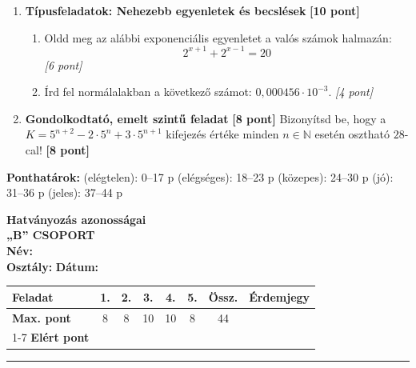 \documentclass[11pt,a4paper]{article}
\begin{document}
\begin{enumerate}
    \vspace{2mm}
    \item \textbf{Típusfeladatok: Nehezebb egyenletek és becslések} \hfill \textbf{[10 pont]}
    \begin{enumerate}
        \item Oldd meg az alábbi exponenciális egyenletet a valós számok halmazán:
        $$2^{x+1} + 2^{x-1} = 20$$ \hfill \textit{[6 pont]}
        \item Írd fel normálalakban a következő számot: $0{,}000456 \cdot 10^{-3}$. \hfill \textit{[4 pont]}
    \end{enumerate}

    \vspace{2mm}
    \item \textbf{Gondolkodtató, emelt szintű feladat} \hfill \textbf{[8 pont]}
    Bizonyítsd be, hogy a $K = 5^{n+2} - 2 \cdot 5^n + 3 \cdot 5^{n+1}$ kifejezés értéke minden $n \in \mathbb{N}$ esetén osztható $28$-cal! \hfill \textbf{[8 pont]}
\end{enumerate}

\vfill
\noindent
\begin{center}
\small
\textbf{Ponthatárok:}  (elégtelen): 0--17 p  (elégséges): 18--23 p  (közepes): 24--30 p  (jó): 31--36 p  (jeles): 37--44 p
\end{center}

\newpage


\noindent
\begin{minipage}[t]{0.45\textwidth}
  \vspace{0pt}
  
  {\Large\textbf{Hatványozás azonosságai}}\\[2mm]
  {\large\textbf{„B” CSOPORT}}\\[2mm]
  \textbf{Név:} \underline{\hspace{4.5cm}}\\[2mm]
  \textbf{Osztály:} \underline{\hspace{1.5cm}} \quad \textbf{Dátum:} \underline{\hspace{2cm}}
\end{minipage}
\hfill
\begin{minipage}[t]{0.53\textwidth}
  \vspace{0pt}
  \begin{flushright}
  {\small
  \begin{tabular}{|l|c|c|c|c|c||c||c|}
    \hline
    \textbf{Feladat} & 1. & 2. & 3. & 4. & 5. & \textbf{Össz.} & \textbf{Érdemjegy} \\ \hline
    \textbf{Max. pont} & 8 & 8 & 10 & 10 & 8 & 44 & \\ \cline{1-7}
    \textbf{Elért pont} &  &  &  &  &  &  &  \\ \hline
  \end{tabular}
  }
  \end{flushright}
\end{minipage}
\vspace{2mm}
\hrule
\vspace{4mm}
\end{document}

